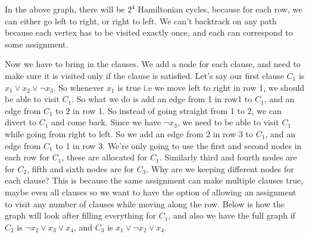\documentclass[12pt]{report}
\begin{document}
\begin{enumerate}[label=\textbf{\arabic*.}]
    In the above graph, there will be $2^4$ Hamiltonian cycles, because for each row, we can either go left to right, or right to left. We can't 
    backtrack on any path because each vertex has to be visited exactly once, and each can correspond to some assignment.

    Now we have to bring in the clauses. We add a node for each clause, and need to make sure it is visited only if the clause is satisfied.
    Let's say our first clause $C_1$ is $x_1 \lor x_2 \lor \lnot x_3$. So whenever $x_1$ is true i.e we move left to right in row 1, we should 
    be able to visit $C_1$. So what we do is add an edge from 1 in row1 to $C_1$, and an edge from $C_1$ to 2 in row 1. So instead of going straight
    from 1 to 2, we can divert to $C_1$ and come back. Since we have $\lnot x_3$, we need to be able to visit $C_1$ while going from right to left.
    So we add an edge from 2 in row 3 to $C_1$, and an edge from $C_1$ to 1 in row 3. We're only going to use the first and second nodes in each row 
    for $C_1$, these are allocated for $C_1$. Similarly third and fourth nodes are for $C_2$, fifth and sixth nodes are for $C_3$. Why are we keeping
    different nodes for each clause? This is because the same assignment can make multiple clauses true, maybe even all clauses so we want to have
    the option of allowing an assignment to visit any number of clauses while moving along the row. Below is how the graph will look after filling
    everything for $C_1$, and also we have the full graph if $C_2$ is $\lnot x_2 \lor x_3 \lor x_4$, and $C_3$ is $x_1 \lor \lnot x_2 \lor x_4$.


\end{enumerate}
\end{document}
